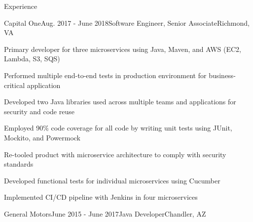 \documentclass{resume} %
\begin{document}

\begin{rSection}{Experience}


\begin{rSubsection}{Capital One}{Aug. 2017 - June 2018}{Software Engineer, Senior Associate}{Richmond, VA}
 
\setlength{\itemindent}{.0in}\item 
Primary developer for three microservices using Java, Maven, and AWS (EC2, Lambda, S3, SQS)
\setlength{\itemindent}{.0in}\item 
Performed multiple end-to-end tests in production environment for business-critical application
\setlength{\itemindent}{.0in}\item 
Developed two Java libraries used across multiple teams and applications for security and code reuse
\setlength{\itemindent}{.0in}\item 
Employed 90\% code coverage for all code by writing unit tests using JUnit, Mockito, and Powermock
\setlength{\itemindent}{.0in}\item 
Re-tooled product with microservice architecture to comply with security standards
\setlength{\itemindent}{.0in}\item
Developed functional tests for individual microservices using Cucumber
\setlength{\itemindent}{.0in}\item
Implemented CI/CD pipeline with Jenkins in four microservices

\end{rSubsection}

\begin{rSubsection}{General Motors}{June 2015 - June 2017}{Java Developer}{Chandler, AZ}


\end{rSubsection}
\end{rSection}
\end{document}
